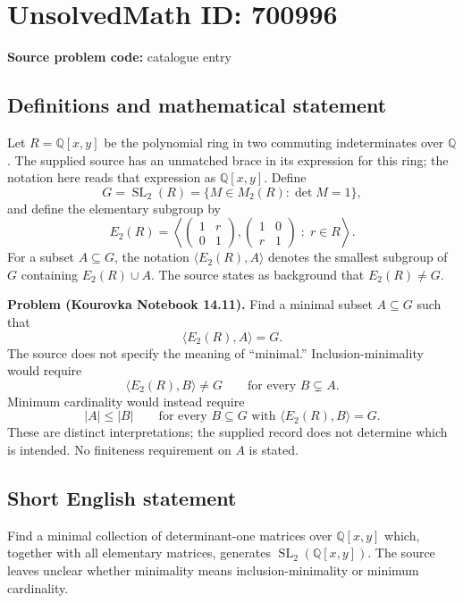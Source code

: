 \documentclass[11pt]{article}
\newcommand{\Q}{\mathbb{Q}}
\begin{document}
\section*{UnsolvedMath ID: 700996}
\textbf{Source problem code:} catalogue entry
\subsection{Definitions and mathematical statement}
Let \(R=\Q[x,y]\) be the polynomial ring in two commuting indeterminates over \(\Q\). The supplied source has an unmatched brace in its expression for this ring; the notation here reads that expression as \(\Q[x,y]\). Define
\[
G=\operatorname{SL}_2(R)=\{M\in M_2(R):\det M=1\},
\]
and define the elementary subgroup by
\[
E_2(R)=\left\langle
\begin{pmatrix}1&r\\0&1\end{pmatrix},
\begin{pmatrix}1&0\\r&1\end{pmatrix}
\;:\;r\in R
\right\rangle.
\]
For a subset \(A\subseteq G\), the notation \(\langle E_2(R),A\rangle\) denotes the smallest subgroup of \(G\) containing \(E_2(R)\cup A\). The source states as background that \(E_2(R)\ne G\).

\textbf{Problem (Kourovka Notebook 14.11).} Find a minimal subset \(A\subseteq G\) such that
\[
\langle E_2(R),A\rangle=G.
\]
The source does not specify the meaning of ``minimal.'' Inclusion-minimality would require
\[
\langle E_2(R),B\rangle\ne G\qquad\text{for every }B\subsetneq A.
\]
Minimum cardinality would instead require
\[
|A|\le |B|\qquad\text{for every }B\subseteq G\text{ with }\langle E_2(R),B\rangle=G.
\]
These are distinct interpretations; the supplied record does not determine which is intended. No finiteness requirement on \(A\) is stated.
\subsection{Short English statement}
Find a minimal collection of determinant-one matrices over \(\Q[x,y]\) which, together with all elementary matrices, generates \(\operatorname{SL}_2(\Q[x,y])\). The source leaves unclear whether minimality means inclusion-minimality or minimum cardinality.
\end{document}
